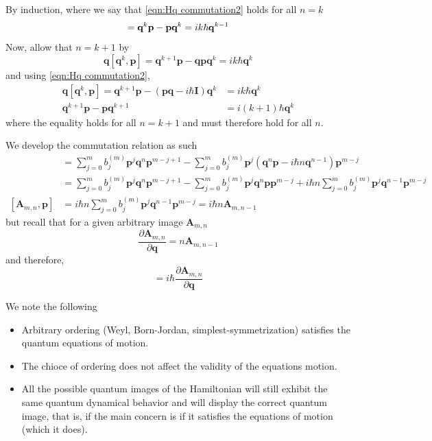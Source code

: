 \documentclass[a4paper]{article}
\theoremstyle{definition}
\begin{document}
By induction, where we say that \ref{eqn:Hq commutation2} holds for all $n=k$
\begin{equation}
	[\textbf{q}^k,\textbf{p}]=\textbf{q}^k\textbf{p}-\textbf{p}\textbf{q}^k=ik\hbar\textbf{\textbf{q}}^{k-1}
\end{equation}
Now, allow that $n=k+1$ by
\begin{equation}
	\textbf{q}[\textbf{q}^k,\textbf{p}]=\textbf{q}^{k+1}\textbf{p}-\textbf{q}\textbf{p}\textbf{q}^{k}=ik\hbar\textbf{q}^{k}
\end{equation}
and using \ref{eqn:Hq commutation2},
\begin{align}
	\textbf{q}[\textbf{q}^k,\textbf{p}]=\textbf{q}^{k+1}\textbf{p}-(\textbf{p}\textbf{q}-i\hbar\textbf{I})\textbf{q}^{k}&=ik\hbar\textbf{q}^{k} \\
	\textbf{q}^{k+1}\textbf{p}-\textbf{p}\textbf{q}^{k+1}&=i(k+1)\hbar\textbf{q}^{k}
\end{align}
where the equality holds for all $n=k+1$ and must therefore hold for all $n$.

We develop the commutation relation as such
\begin{align}
	[\textbf{A}_{m,n},\textbf{p}]&=\sum_{j=0}^mb_j^{(m)}\textbf{p}^j\textbf{q}^n\textbf{p}^{m-j+1}-\sum_{j=0}^mb_j^{(m)}\textbf{p}^{j}(\textbf{q}^n\textbf{p}-i\hbar n\textbf{q}^{n-1})\textbf{p}^{m-j} \\
	&=\sum_{j=0}^mb_j^{(m)}\textbf{p}^j\textbf{q}^n\textbf{p}^{m-j+1}-\sum_{j=0}^mb_j^{(m)}\textbf{p}^{j}\textbf{q}^n\textbf{p}\textbf{p}^{m-j}+i\hbar n\sum_{j=0}^mb_j^{(m)}\textbf{p}^{j}\textbf{q}^{n-1}\textbf{p}^{m-j} \\
	[\textbf{A}_{m,n},\textbf{p}]&=i\hbar n\sum_{j=0}^mb_j^{(m)}\textbf{p}^{j}\textbf{q}^{n-1}\textbf{p}^{m-j}=i\hbar n\textbf{A}_{m,n-1}
\end{align}
but recall that for a given arbitrary image $\textbf{A}_{m,n}$
\begin{equation}
	\frac{\partial\textbf{A}_{m,n}}{\partial\textbf{q}}=n\textbf{A}_{m,n-1}
\end{equation}
and therefore,
\begin{equation}
	[\textbf{A}_{m,n},\textbf{p}]=i\hbar\frac{\partial\textbf{A}_{m,n}}{\partial\textbf{q}}
\end{equation}

We note the following
\begin{itemize}
	\item Arbitrary ordering (Weyl, Born-Jordan, simplest-symmetrization) satisfies the quantum equations of motion.
	\item The chioce of ordering does not affect the validity of the equations motion.
	\item All the possible quantum images of the Hamiltonian will still exhibit the same quantum dynamical behavior and will display the correct quantum image, that is, if the main concern is if it satisfies the equations of motion (which it does).
\end{itemize}
\end{document}
